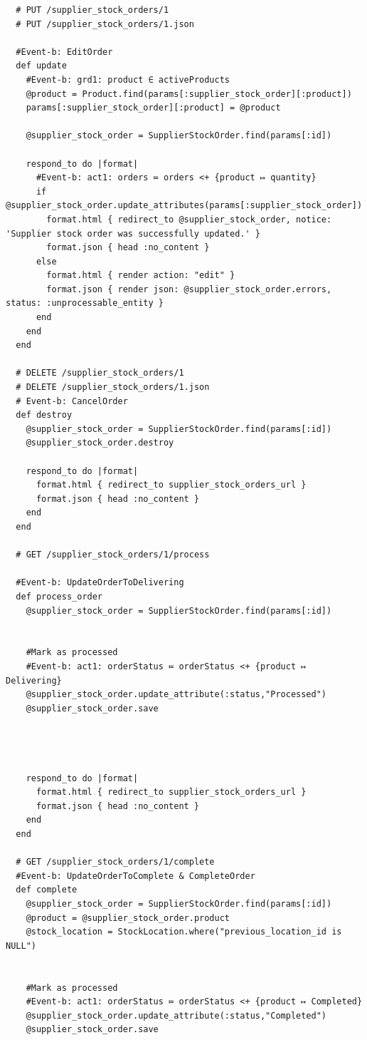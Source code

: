 \documentclass[a4paper]{article}
\begin{document}
\begin{verbatim}
  # PUT /supplier_stock_orders/1
  # PUT /supplier_stock_orders/1.json

  #Event-b: EditOrder
  def update
    #Event-b: grd1: product ∈ activeProducts
    @product = Product.find(params[:supplier_stock_order][:product])
    params[:supplier_stock_order][:product] = @product

    @supplier_stock_order = SupplierStockOrder.find(params[:id])

    respond_to do |format|
      #Event-b: act1: orders ≔ orders <+ {product ↦ quantity}
      if @supplier_stock_order.update_attributes(params[:supplier_stock_order])
        format.html { redirect_to @supplier_stock_order, notice: 'Supplier stock order was successfully updated.' }
        format.json { head :no_content }
      else
        format.html { render action: "edit" }
        format.json { render json: @supplier_stock_order.errors, status: :unprocessable_entity }
      end
    end
  end

  # DELETE /supplier_stock_orders/1
  # DELETE /supplier_stock_orders/1.json
  # Event-b: CancelOrder
  def destroy
    @supplier_stock_order = SupplierStockOrder.find(params[:id])
    @supplier_stock_order.destroy

    respond_to do |format|
      format.html { redirect_to supplier_stock_orders_url }
      format.json { head :no_content }
    end
  end

  # GET /supplier_stock_orders/1/process

  #Event-b: UpdateOrderToDelivering
  def process_order
    @supplier_stock_order = SupplierStockOrder.find(params[:id])


    #Mark as processed
    #Event-b: act1: orderStatus ≔ orderStatus <+ {product ↦ Delivering}
    @supplier_stock_order.update_attribute(:status,"Processed")
    @supplier_stock_order.save

 


    respond_to do |format|
      format.html { redirect_to supplier_stock_orders_url }
      format.json { head :no_content }
    end
  end

  # GET /supplier_stock_orders/1/complete
  #Event-b: UpdateOrderToComplete & CompleteOrder
  def complete
    @supplier_stock_order = SupplierStockOrder.find(params[:id])
    @product = @supplier_stock_order.product
    @stock_location = StockLocation.where("previous_location_id is NULL")


    #Mark as processed
    #Event-b: act1: orderStatus ≔ orderStatus <+ {product ↦ Completed}
    @supplier_stock_order.update_attribute(:status,"Completed")
    @supplier_stock_order.save


\end{verbatim}
\end{document}

